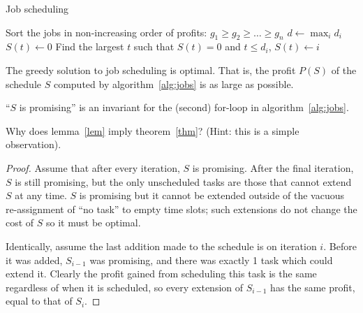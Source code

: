 \documentclass{article}
\newenvironment{thm}[1]
	{\renewcommand\theinnerthm{#1}\innerthm}
	{\endinnerthm}
\newenvironment{lem}[1]
	{\renewcommand\theinnerlem{#1}\innerlem}
	{\endinnerlem}
\newenvironment{prb}[1]
	{\renewcommand\theinnerprb{#1}\innerprb}
	{\endinnerprb}
\begin{document}
\begin{algorithm}
\caption{Job scheduling}%
\label{alg:jobs}%
\begin{algorithmic}[1]
\STATE Sort the jobs in non-increasing order of profits:
  $g_1\geq g_2\geq\ldots\geq g_n$ 
\STATE $d\longleftarrow\max_id_i$ 
     \STATE $S(t)\longleftarrow 0$ 
\ENDFOR
{} 
     \STATE Find the largest $t$ such that $S(t)=0$ and $t\leq d_i$,
            $S(t)\longleftarrow i$
\ENDFOR
\end{algorithmic}
\end{algorithm}

\begin{thm}{2.18}\label{thm}
The greedy solution to job scheduling is optimal. That is, the profit $P(S)$ of the schedule $S$ computed
by algorithm~\ref{alg:jobs} is as large as possible.
\end{thm}

\begin{lem}{2.19}\label{lem}
``$S$ is promising'' is an invariant for the (second) for-loop
in algorithm~\ref{alg:jobs}.   
\end{lem}

\begin{prb}{2.21}
Why does lemma~\ref{lem} imply theorem~\ref{thm}?
(Hint: this is a simple observation). 
\end{prb}

\begin{proof}
Assume that after every iteration, $S$ is promising. After 
the final iteration, $S$ is still
promising, but the only unscheduled tasks are those that 
cannot extend $S$ at any time. $S$ is 
promising but it cannot be extended outside of the vacuous
re-assignment of ``no task'' to empty time slots; such
extensions do not change the cost of $S$ so it must be optimal.

Identically, assume the last addition made to the schedule is on iteration
$i$. Before it was added,
$S_{i-1}$ was promising, and there was exactly 1 task which could extend
it. Clearly the profit gained from scheduling this task is the same
regardless of when it is scheduled, so every extension of $S_{i-1}$ has
the same profit, equal to that of $S_i$.
\end{proof}
\end{document}

